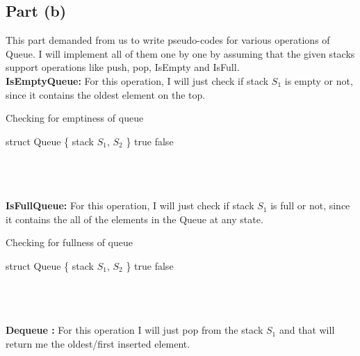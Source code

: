 \documentclass{article}
\begin{document}
{    \subsection {Part (b)} {
        This part demanded from us to write pseudo-codes for various operations of Queue. I will implement all of them one by one by assuming that the given stacks support operations like push, pop, IsEmpty and IsFull. \newline \\
        \textbf{IsEmptyQueue: } For this operation, I will just check if stack $S_1$ is empty or not, since it contains the oldest element on the top. \newline \\
        \colorbox[gray]{0.95}{
        \begin{algorithm2e}[H] 
        \caption{Checking for emptiness of queue}
            \DontPrintSemicolon
            struct Queue \{ stack $S_1$, $S_2$ \}\;
             {
                 {
                    \KwRet true
                }
                \KwRet false
            }
        \end{algorithm2e}
        }
        \\ \\ \\ 
        \textbf{IsFullQueue: } For this operation, I will just check if stack $S_1$ is full or not, since it contains the all of the elements in the Queue at any state. \newline \\
        \colorbox[gray]{0.95}{
        \begin{algorithm2e}[H] 
        \caption{Checking for fullness of queue}
            \DontPrintSemicolon
            struct Queue \{ stack $S_1$, $S_2$ \}\;
             {
                 {
                    \KwRet true
                }
                \KwRet false
            }
        \end{algorithm2e}
        }
        \\ \\ \\
        \textbf{Dequeue :} For this operation I will just pop from the stack $S_1$ and that will return me the oldest/first inserted element. \newline \\ 
}}
\end{document}
